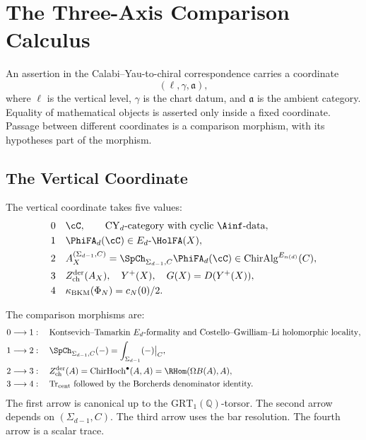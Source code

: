 \chapter{The Three-Axis Comparison Calculus}
\label{app:three-axis-scope-discipline}

\providecommand{\Zder}{Z^{\mathrm{der}}_{\mathrm{ch}}}
\providecommand{\GRTone}{\mathrm{GRT}_1(\mathbb{Q})}

An assertion in the Calabi--Yau-to-chiral correspondence carries a
coordinate
\[
 (\ell,\gamma,\mathfrak a),
\]
where \(\ell\) is the vertical level, \(\gamma\) is the chart datum, and
\(\mathfrak a\) is the ambient category.  Equality of mathematical
objects is asserted only inside a fixed coordinate.  Passage between
different coordinates is a comparison morphism, with its hypotheses part
of the morphism.

\section{The Vertical Coordinate}
\label{sec:tas-vertical}

The vertical coordinate takes five values:
\begin{align*}
0 &\quad \cC,\qquad \mathrm{CY}_d\text{-category with cyclic }\Ainf
      \text{-data},\\
1 &\quad \PhiFA_d(\cC)\in E_d\text{-}\HolFA(X),\\
2 &\quad A_X^{(\Sigma_{d-1},C)}
      =\SpCh_{\Sigma_{d-1},C}\PhiFA_d(\cC)
      \in \mathrm{ChirAlg}^{E_{n(d)}}(C),\\
3 &\quad \Zder(A_X),\quad Y^+(X),\quad
      G(X)=D(Y^+(X)),\\
4 &\quad \kappa_{\mathrm{BKM}}(\Phi_N)=c_N(0)/2 .
\end{align*}

The comparison morphisms are:
\begin{align*}
0\longrightarrow 1 &: \quad
  \text{Kontsevich--Tamarkin }E_d\text{-formality and
  Costello--Gwilliam--Li holomorphic locality},\\
1\longrightarrow 2 &: \quad
  \SpCh_{\Sigma_{d-1},C}(-)=
  \int_{\Sigma_{d-1}}(-)\big|_C,\\
2\longrightarrow 3 &: \quad
  \Zder(A)=\mathrm{ChirHoch}^{\bullet}(A,A)
  =\RHom(\Omega B(A),A),\\
3\longrightarrow 4 &: \quad
  \mathrm{Tr}_{\mathrm{cent}}\text{ followed by the Borcherds
  denominator identity.}
\end{align*}
The first arrow is canonical up to the \(\GRTone\)-torsor.  The second
arrow depends on \((\Sigma_{d-1},C)\).  The third arrow uses the bar
resolution.  The fourth arrow is a scalar trace.

